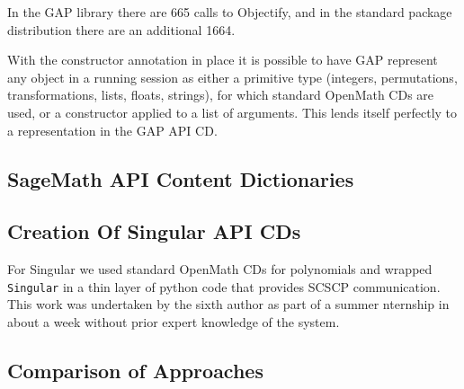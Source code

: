 In the GAP library there are 665 calls to Objectify, and in the standard package
distribution there are an additional 1664.

With the constructor annotation in place it is possible to have GAP represent
any object in a running session as either a primitive type (integers,
permutations, transformations, lists, floats, strings), for which standard
OpenMath CDs are used, or a constructor applied to a list of arguments. This
lends itself perfectly to a representation in the GAP API CD.



\subsection{SageMath API Content Dictionaries}

\subsection{Creation Of Singular API CDs}

For Singular we used standard OpenMath CDs for polynomials and wrapped
\texttt{Singular} in a thin layer of python code that provides SCSCP
communication. This work was undertaken by the sixth author as part of a summer
nternship in about a week without prior expert
knowledge of the system.

\subsection{Comparison of Approaches}


